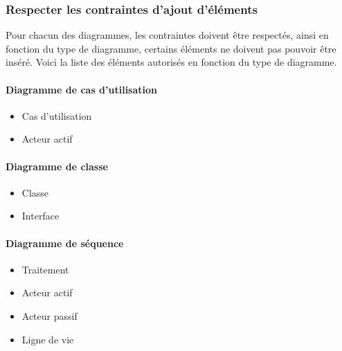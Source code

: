 \documentclass[12pt,a4paper,openany]{report}
\begin{document}
		\subsubsection{Respecter les contraintes d'ajout d'éléments}
		Pour chacun des diagrammes, les contraintes doivent être respectés, ainsi en fonction du type de diagramme, certains éléments ne doivent pas pouvoir
		être inséré. Voici la liste des éléments autorisés en fonction du type de diagramme.
		\begin{multicols}{2}
		\paragraph{Diagramme de cas d'utilisation}
		\begin{itemize}
			\item Cas d'utilisation
			\item Acteur actif
		\end{itemize}
		\paragraph{Diagramme de classe}
		\begin{itemize}
			\item Classe
			\item Interface
		\end{itemize}
		\paragraph{Diagramme de séquence}
		\begin{itemize}
			\item Traitement
			\item Acteur actif 
			\item Acteur passif
			\item Ligne de vie 
		\end{itemize}
		\end{multicols}
\end{document}
